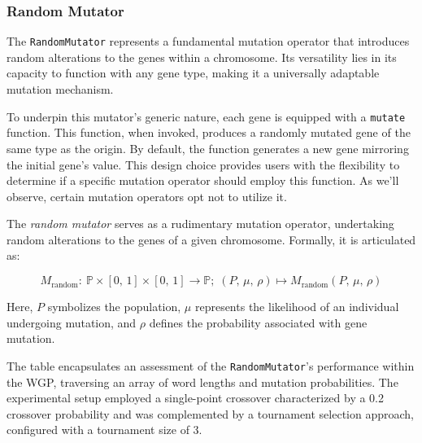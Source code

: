 \subsubsection{Random Mutator}
\label{sec:keen:operators:mutation:simple}

  The \texttt{RandomMutator} represents a fundamental mutation operator that
  introduces random alterations to the genes within a chromosome. Its versatility 
  lies in its capacity to function with any gene type, making it a universally 
  adaptable mutation mechanism.

  To underpin this mutator's generic nature, each gene is equipped with a
  \texttt{mutate} function. This function, when invoked, produces a randomly 
  mutated gene of the same type as the origin. By default, the function generates 
  a new gene mirroring the initial gene's value. This design choice provides 
  users with the flexibility to determine if a specific mutation operator should 
  employ this function. As we'll observe, certain mutation operators opt not to 
  utilize it.

  \begin{definition}
    The \emph{random mutator} serves as a rudimentary mutation operator, 
    undertaking random alterations to the genes of a given chromosome. 
    Formally, it is articulated as:

    \begin{equation}
      M_\mathrm{random} :\: \mathbb{P} \times [0,\, 1] \times [0,\, 1] \to 
      \mathbb{P};\;
      (P,\, \mu,\, \rho) \mapsto M_\mathrm{random}(P,\, \mu,\, \rho)
    \end{equation}

    Here, \(P\) symbolizes the population, \(\mu\) represents the likelihood of 
    an individual undergoing mutation, and \(\rho\) defines the probability 
    associated with gene mutation.
  \end{definition}


  \begin{table}[H]
    \caption{
      The table encapsulates an assessment of the \texttt{RandomMutator}'s 
      performance within the WGP, traversing an array of word lengths and 
      mutation probabilities. The experimental setup employed a single-point 
      crossover characterized by a 0.2 crossover probability and was 
      complemented by a tournament selection approach, configured with a 
      tournament size of 3.
    }
    \label{tab:keen:op:mut:random}
  \end{table}
